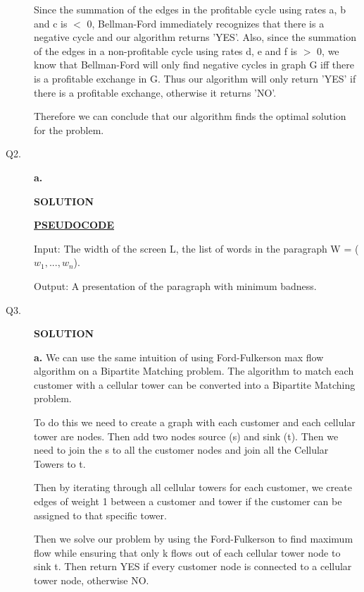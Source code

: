 \documentclass[11pt]{csc_assignment}
\begin{document}
\begin{description}
Since the summation of the edges in the profitable cycle using rates a, b and c is $<$ 0, Bellman-Ford immediately recognizes that there is a negative cycle and our algorithm returns 'YES'. Also, since the summation of the edges in a non-profitable cycle using rates d, e and f is $>$ 0, we know that Bellman-Ford will only find negative cycles in graph G iff there is a profitable exchange in G. Thus our algorithm will only return 'YES' if there is a profitable exchange, otherwise it returns 'NO'.

Therefore we can conclude that our algorithm finds the optimal solution for the problem.

\newpage
\item[Q2.]
\textbf{a.}

\textbf{SOLUTION}


\underline{\textbf{PSEUDOCODE}}

Input: The width of the screen L, the list of words in the paragraph W = ($w_1, ..., w_n$).

Output: A presentation of the paragraph with minimum badness.



\newpage
\item[Q3.]


\textbf{SOLUTION}

\textbf{a.} We can use the same intuition of using Ford-Fulkerson max flow algorithm on a Bipartite Matching problem. The algorithm to match each customer with a cellular tower can be converted into a Bipartite Matching problem.

To do this we need to create a graph with each customer and each cellular tower are nodes. Then add two nodes source (s) and sink (t). Then we need to join the s to all the customer nodes and join all the Cellular Towers to t.

Then by iterating through all cellular towers for each customer, we create edges of weight 1 between a customer and tower if the customer can be assigned to that specific tower.

Then we solve our problem by using the Ford-Fulkerson to find maximum flow while ensuring that only k flows out of each cellular tower node to sink t. Then return YES if every customer node is connected to a cellular tower node, otherwise NO.


\end{description}
\end{document}
